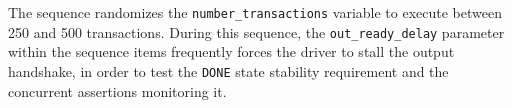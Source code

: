 The sequence randomizes the \texttt{number\_transactions} variable to execute between 250 and 500 transactions. During this sequence, the \texttt{out\_ready\_delay} parameter within the sequence items frequently forces the driver to stall the output handshake, in order to test the \texttt{DONE} state stability requirement and the concurrent assertions monitoring it.